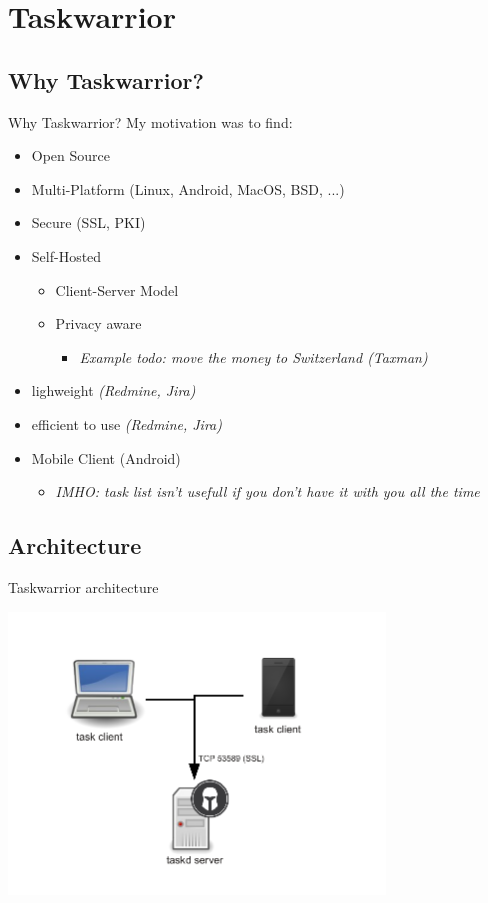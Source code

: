 \documentclass[xcolor=x11names,compress]{beamer}
\renewcommand{\(}{\begin{columns}}
\renewcommand{\)}{\end{columns}}
\newcommand{\<}[1]{\begin{column}{#1}}
\renewcommand{\>}{\end{column}}
\begin{document}
\section{Taskwarrior}

\subsection{Why Taskwarrior?}
\begin{frame}{Why Taskwarrior?}
\pause
My motivation was to find:
\pause
	\begin{itemize}[<+-| alert@+>]
		\item Open Source
		\item Multi-Platform (Linux, Android, MacOS, BSD, ...)
		\item Secure (SSL, PKI)
		\item Self-Hosted
		\begin{itemize}
			\item Client-Server Model
			\item Privacy aware
			\begin{itemize}
				\item \textit{Example todo: move the money to Switzerland (Taxman)}
			\end{itemize}
		\end{itemize}
		\item lighweight \textit{(Redmine, Jira)}
		\item efficient to use \textit{(Redmine, Jira)}
		\item Mobile Client (Android)
		\begin{itemize}
			\item \textit{IMHO: task list isn't usefull if you don't have it with you all the time}
		\end{itemize}
	\end{itemize}
\end{frame}

\subsection{Architecture}
\begin{frame}[fragile]{Taskwarrior architecture}
	\begin{center}
		\includegraphics[height=7.5cm]{taskwarrior_architecture.pdf}
	\end{center}
\end{frame}
\end{document}
